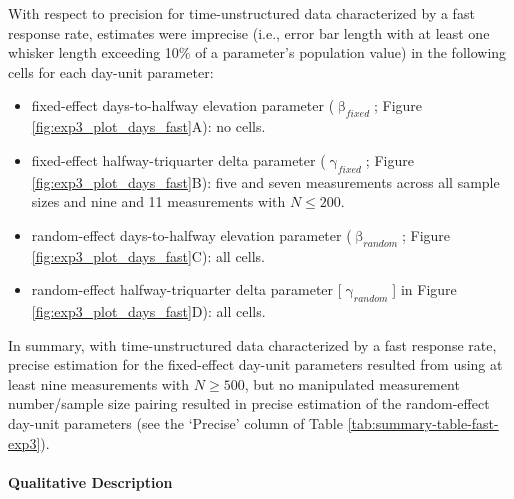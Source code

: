 \documentclass[
12pt, %
twoside,
english]{guelphthesis}
\begin{document}
With respect to precision for time-unstructured data characterized by a fast response rate, estimates were imprecise (i.e., error bar length with at least one whisker length exceeding 10\% of a parameter's population value) in the following cells for each day-unit parameter:
\begin{itemize}
\tightlist
\item
  fixed-effect days-to-halfway elevation parameter (\(\upbeta_{fixed}\); Figure \ref{fig:exp3_plot_days_fast}A): no cells.
\item
  fixed-effect halfway-triquarter delta parameter (\(\upgamma_{fixed}\); Figure \ref{fig:exp3_plot_days_fast}B): five and seven measurements across all sample sizes and nine and 11 measurements with \(N \le 200\).
\item
  random-effect days-to-halfway elevation parameter (\(\upbeta_{random}\); Figure \ref{fig:exp3_plot_days_fast}C): all cells.
\item
  random-effect halfway-triquarter delta parameter {[}\(\upgamma_{random}\){]} in Figure \ref{fig:exp3_plot_days_fast}D): all cells.
\end{itemize}
In summary, with time-unstructured data characterized by a fast response rate, precise estimation for the fixed-effect day-unit parameters resulted from using at least nine measurements with \(N \ge 500\), but no manipulated measurement number/sample size pairing resulted in precise estimation of the random-effect day-unit parameters (see the `Precise' column of Table \ref{tab:summary-table-fast-exp3}).

\hypertarget{qualitative-fast-exp3}{%
\paragraph{Qualitative Description}\label{qualitative-fast-exp3}}
\end{document}
